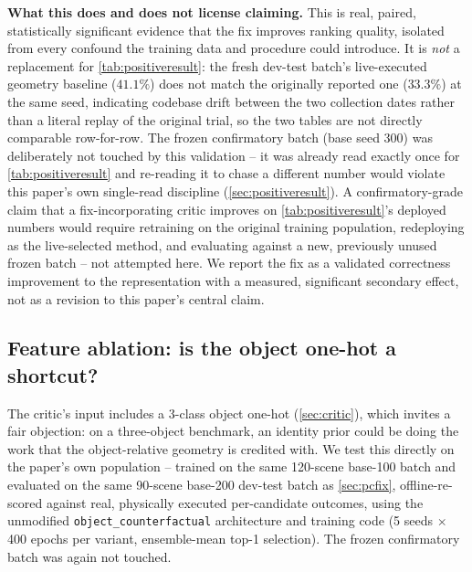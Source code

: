 \documentclass[journal]{IEEEtran}
\begin{document}
\textbf{What this does and does not license claiming.} This is real,
paired, statistically significant evidence that the fix improves ranking
quality, isolated from every confound the training data and procedure could
introduce. It is \emph{not} a replacement for \cref{tab:positiveresult}: the
fresh dev-test batch's live-executed geometry baseline ($41.1\%$) does not
match the originally reported one ($33.3\%$) at the same seed, indicating
codebase drift between the two collection dates rather than a literal
replay of the original trial, so the two tables are not directly
comparable row-for-row. The frozen confirmatory batch (base seed 300) was
deliberately not touched by this validation -- it was already read exactly
once for \cref{tab:positiveresult} and re-reading it to chase a different
number would violate this paper's own single-read discipline
(\cref{sec:positiveresult}). A confirmatory-grade claim that a
fix-incorporating critic improves on \cref{tab:positiveresult}'s deployed
numbers would require retraining on the original training population,
redeploying as the live-selected method, and evaluating against a new,
previously unused frozen batch -- not attempted here. We report the fix as
a validated correctness improvement to the representation with a measured,
significant secondary effect, not as a revision to this paper's central
claim.

\subsection{Feature ablation: is the object one-hot a shortcut?}
\label{sec:onehot}

The critic's input includes a 3-class object one-hot
(\cref{sec:critic}), which invites a fair objection: on a three-object
benchmark, an identity prior could be doing the work that the
object-relative geometry is credited with. We test this directly on the
paper's own population -- trained on the same 120-scene base-100 batch and
evaluated on the same 90-scene base-200 dev-test batch as
\cref{sec:pcfix}, offline-re-scored against real, physically executed
per-candidate outcomes, using the unmodified
\texttt{object\_counterfactual} architecture and training code (5 seeds
$\times$ 400 epochs per variant, ensemble-mean top-1 selection). The
frozen confirmatory batch was again not touched.
\end{document}
